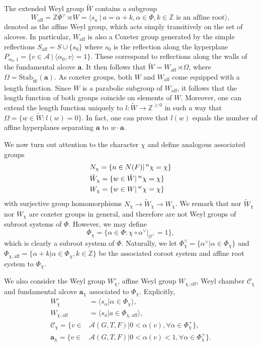 \documentclass{article}
\newcommand{\aff}{\mathrm{aff}}
\newcommand{\valpha}{\alpha^\vee}
\newcommand{\vPhi}{\Phi^\vee}
\newcommand{\cO}{\mathcal{O}}
\newcommand{\ZZ}{\mathbb{Z}}
\theoremstyle{plain}
\theoremstyle{definition}
\begin{document}
    The extended Weyl group $\tilde{W}$ contains a subgroup $$W_{\aff}=\ZZ\vPhi\rtimes W=\langle s_a\ |\ a=\alpha+k,\alpha\in\Phi,k\in\ZZ \text{ is an affine root}\rangle,$$ denoted as the affine Weyl group, which acts simply transitively on the set of alcoves. In particular, $W_{\aff}$ is also a Coxeter group generated by the simple reflections $S_{\aff}=S\cup\{s_0\}$ where $s_0$ is the reflection along the hyperplane $P_{\alpha_0,1}=\{v\in\mathcal{A}\ |\ \langle\alpha_0,v\rangle=1\}$. These correspond to reflections along the walls of the fundamental alcove $\mathbf{a}$. It then follows that $\tilde{W}=W_{\aff}\rtimes\Omega$, where $\Omega=\mathrm{Stab}_{\tilde{W}}(\mathbf{a})$. As coxeter groups, both $W$ and $W_{\aff}$ come equipped with a length function. Since $W$ is a parabolic subgroup of $W_{\aff}$, it follows that the length function of both groups coincide on elements of $W$. Moreover, one can extend the length function uniquely to $l:\tilde{W}\rightarrow\ZZ^{\geq0}$ in such a way that $\Omega=\{w\in\tilde{W}:l(w)=0\}$. In fact, one can prove that $l(w)$ equals the number of affine hyperplanes separating $\mathbf{a}$ to $w\cdot\mathbf{a}$.

    We now turn out attention to the character $\chi$ and define analogous associated groups
    \begin{align*}
        &N_{\chi}=\{n\in N(F)|\prescript{n}{}{\chi}=\chi\}\\
        &\tilde{W}_{\chi}=\{w\in \tilde{W}|\prescript{w}{}{\chi}=\chi\}\\
        &W_{\chi}=\{w\in W|\prescript{w}{}{\chi}=\chi\}
    \end{align*}
    with surjective group homomorphisms $N_\chi\rightarrow\tilde{W}_\chi\rightarrow W_\chi$. We remark that nor $\tilde{W}_\chi$ nor $W_\chi$ are coxeter groups in general, and therefore are not Weyl groups of subroot systems of $\Phi$. However, we may define $$\Phi_\chi=\{\alpha\in\Phi:\chi\circ\alpha^\vee|_{\cO^\times}=1\},$$ which is clearly a subroot system of $\Phi$. Naturally, we let $\vPhi_\chi=\{\valpha|\alpha\in\Phi_\chi\}$ and $\Phi_{\chi,\aff}=\{\alpha+k|\alpha\in\Phi_\chi,k\in\ZZ\}$ be the associated coroot system and affine root system to $\Phi_\chi$. 
    
    We also consider the Weyl group $W_\chi^\circ$, affine Weyl group $W_{\chi,\aff}$, Weyl chamber $\mathcal{C}_\chi$ and fundamental alcove $\mathbf{a}_\chi$ associated to $\Phi_\chi$. Explicitly,
    \begin{align*}
        W_\chi^\circ&=\langle s_\alpha|\alpha\in\Phi_\chi\rangle,\\
        W_{\chi,\textrm{aff}}&=\langle s_a | a\in\Phi_{\chi,\aff}\rangle,\\
        \mathcal{C}_\chi=\{v\in&\mathcal{A}(G,T,F)|0<\alpha(v), \forall\alpha\in\Phi_\chi^+\},\\
        \mathbf{a}_\chi=\{v\in&\mathcal{A}(G,T,F)|0<\alpha(v)<1, \forall\alpha\in\Phi_\chi^+\}.
    \end{align*}
\end{document}

